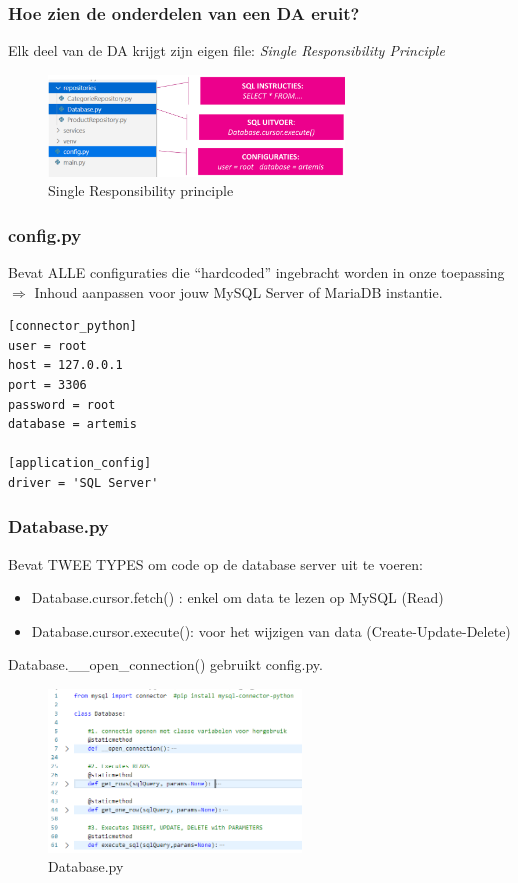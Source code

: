 \documentclass{article}
\begin{document}
\subsubsection{Hoe zien de onderdelen van een DA eruit?}
Elk deel van de DA krijgt zijn eigen file: \textit{Single Responsibility Principle}

\begin{figure}[H]
    \centering
    \includegraphics[width=0.7\textwidth]{Screenshot_20200503_152141.png}
    \caption{Single Responsibility principle}
\end{figure}

\subsubsection{config.py}
Bevat ALLE configuraties die “hardcoded” ingebracht worden in onze toepassing $\Rightarrow$ Inhoud aanpassen voor jouw MySQL Server of MariaDB instantie.

\begin{lstlisting}
[connector_python]
user = root
host = 127.0.0.1
port = 3306
password = root
database = artemis

[application_config]
driver = 'SQL Server'
\end{lstlisting}

\subsubsection{Database.py}
Bevat TWEE TYPES om code op de database server uit te voeren:
\begin{itemize}
    \item Database.cursor.fetch() : enkel om data te lezen op MySQL (Read)
    \item Database.cursor.execute(): voor het wijzigen van data (Create-Update-Delete)
\end{itemize}

Database.\_\_open\_connection() gebruikt config.py.

\begin{figure}[H]
    \centering
    \includegraphics[width=0.6\textwidth]{database-py.png}
    \caption{Database.py}
\end{figure}
\end{document}
